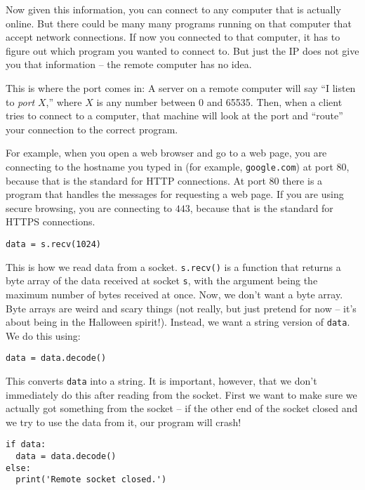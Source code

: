 \documentclass[11pt]{cselabheader}
\begin{document}
Now given this information, you can connect to any computer that is actually
online. But there could be many many programs running on that computer that
accept network connections. If now you connected to that computer, it has to
figure out which program you wanted to connect to. But just the IP does not give
you that information -- the remote computer has no idea.

This is where the port comes in: A server on a remote computer will say ``I
listen to \emph{port} $X$,'' where $X$ is any number between 0 and 65535. Then,
when a client tries to connect to a computer, that machine will look at the port
and ``route'' your connection to the correct program.

For example, when you open a web browser and go to a web page, you are
connecting to the hostname you typed in (for example, \texttt{google.com}) at
port $80$, because that is the standard for HTTP connections. At port $80$ there
is a program that handles the messages for requesting a web page. If you are
using secure browsing, you are connecting to $443$, because that is the standard
for HTTPS connections.

\begin{lstlisting}
data = s.recv(1024)
\end{lstlisting}

This is how we read data from a socket. \lstinline{s.recv()} is a function that returns
a byte array of the data received at socket \lstinline{s}, with the argument being the
maximum number of bytes received at once. Now, we don't want a byte array. Byte arrays
are weird and scary things (not really, but just pretend for now -- it's about being
in the Halloween spirit!). Instead, we want a string version of \lstinline{data}. We do
this using:

\begin{lstlisting}
data = data.decode()
\end{lstlisting}

This converts \lstinline{data} into a string. It is important, however, that we don't
immediately do this after reading from the socket. First we want to make sure we actually
got something from the socket -- if the other end of the socket closed and we try to use
the data from it, our program will crash!

\begin{lstlisting}
if data:
  data = data.decode()
else:
  print('Remote socket closed.')
\end{lstlisting}
\end{document}

